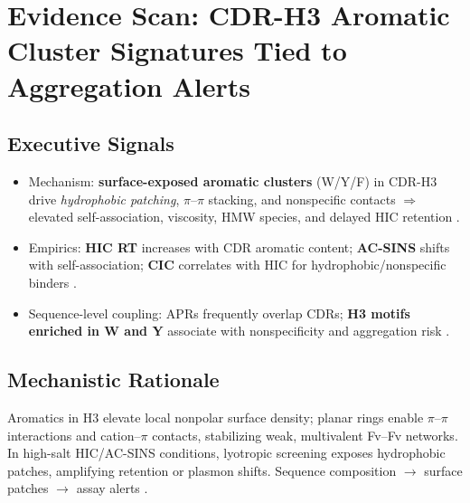 \section*{Evidence Scan: CDR-H3 Aromatic Cluster Signatures Tied to Aggregation Alerts}

\subsection*{Executive Signals}
\begin{itemize}
  \item Mechanism: \textbf{surface-exposed aromatic clusters} (W/Y/F) in CDR-H3 drive \emph{hydrophobic patching}, $\pi$–$\pi$ stacking, and nonspecific contacts $\Rightarrow$ elevated self-association, viscosity, HMW species, and delayed HIC retention \cite{Hebditch2019,Jain2017,Geoghegan2016,Park2024,Phan2022}.
  \item Empirics: \textbf{HIC RT} increases with CDR aromatic content; \textbf{AC-SINS} shifts with self-association; \textbf{CIC} correlates with HIC for hydrophobic/nonspecific binders \cite{Hebditch2019,Jain2017,Waibl2021,Kohli2015}.
  \item Sequence-level coupling: APRs frequently overlap CDRs; \textbf{H3 motifs enriched in W and Y} associate with nonspecificity and aggregation risk \cite{Wang2010,Kelly2017}.
\end{itemize}

\subsection*{Mechanistic Rationale}
Aromatics in H3 elevate local nonpolar surface density; planar rings enable $\pi$–$\pi$ interactions and cation–$\pi$ contacts, stabilizing weak, multivalent Fv–Fv networks. In high-salt HIC/AC-SINS conditions, lyotropic screening exposes hydrophobic patches, amplifying retention or plasmon shifts. Sequence composition $\rightarrow$ surface patches $\rightarrow$ assay alerts \cite{Hebditch2019,Jain2017,Phan2022,Waibl2021}.

